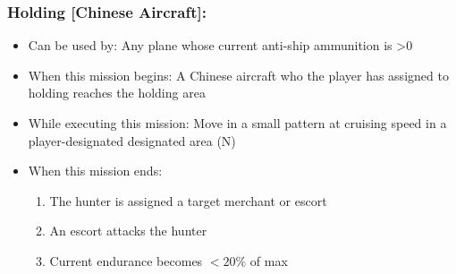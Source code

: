 \documentclass{article}
\begin{document}
    \subsubsection{Holding [Chinese Aircraft]:}
            \begin{itemize}
                \item{Can be used by:} Any plane whose current anti-ship ammunition is \textgreater 0
                \item{When this mission begins:} A Chinese aircraft who the player has assigned to holding reaches the holding area
                \item{While executing this mission:} Move in a small pattern at cruising speed in a player-designated designated area (N)
                \item{When this mission ends:} 
                \begin{enumerate}[label=\arabic*)]
                        \item The hunter is assigned a target merchant or escort \par
                        [hunter gains tracking mission on its target]
                        
                        \item An escort attacks the hunter \par
                        [hunter transits to base, report escort attack]
                    \item Current endurance becomes $<20\%$ of max \par
                    [hunter transits to base]
                \end{enumerate}
            \end{itemize}
            
\end{document}
